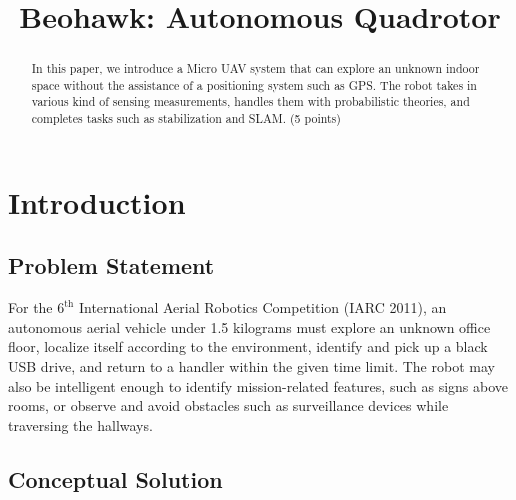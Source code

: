 \documentclass[12pt, letterpaper]{article}
\title{Beohawk: Autonomous Quadrotor}
\begin{document}
\maketitle
\begin{people}

\end{people}

\begin{abstract}
	In this paper, we introduce a Micro UAV system that can explore an unknown indoor space without the assistance of a positioning system such as GPS. The robot takes in various kind of sensing measurements, handles them with probabilistic theories, and completes tasks such as stabilization and SLAM.  (5 points)
\end{abstract}

\section{Introduction}

\subsection{Problem Statement}

For the $6^\text{th}$ International Aerial Robotics Competition (IARC 2011), an autonomous aerial vehicle under 1.5 kilograms must explore an unknown office floor, localize itself according to the environment, identify and pick up a black USB drive, and return to a handler within the given time limit. The robot may also be intelligent enough to identify mission-related features, such as signs above rooms, or observe and avoid obstacles such as surveillance devices while traversing the hallways.

\subsection{Conceptual Solution}
\end{document}
